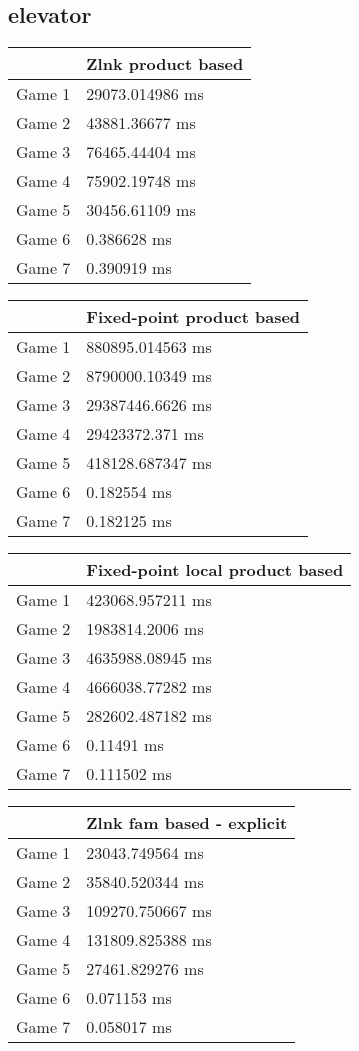 \subsection{elevator}
\begin{tabular}{|l|l|}
	\hline
	& Zlnk product based \\ \hline
	Game 1 & 29073.014986 ms \\ \hline
	Game 2 & 43881.36677 ms \\ \hline
	Game 3 & 76465.44404 ms \\ \hline
	Game 4 & 75902.19748 ms \\ \hline
	Game 5 & 30456.61109 ms \\ \hline
	Game 6 & 0.386628 ms \\ \hline
	Game 7 & 0.390919 ms \\ \hline
\end{tabular}
\begin{tabular}{|l|l|}
	\hline
	& Fixed-point product based \\ \hline
	Game 1 & 880895.014563 ms \\ \hline
	Game 2 & 8790000.10349 ms \\ \hline
	Game 3 & 29387446.6626 ms \\ \hline
	Game 4 & 29423372.371 ms \\ \hline
	Game 5 & 418128.687347 ms \\ \hline
	Game 6 & 0.182554 ms \\ \hline
	Game 7 & 0.182125 ms \\ \hline
\end{tabular}
\begin{tabular}{|l|l|}
	\hline
	& Fixed-point local product based \\ \hline
	Game 1 & 423068.957211 ms \\ \hline
	Game 2 & 1983814.2006 ms \\ \hline
	Game 3 & 4635988.08945 ms \\ \hline
	Game 4 & 4666038.77282 ms \\ \hline
	Game 5 & 282602.487182 ms \\ \hline
	Game 6 & 0.11491 ms \\ \hline
	Game 7 & 0.111502 ms \\ \hline
\end{tabular}
\begin{tabular}{|l|l|}
	\hline
	& Zlnk fam based - explicit \\ \hline
	Game 1 & 23043.749564 ms \\ \hline
	Game 2 & 35840.520344 ms \\ \hline
	Game 3 & 109270.750667 ms \\ \hline
	Game 4 & 131809.825388 ms \\ \hline
	Game 5 & 27461.829276 ms \\ \hline
	Game 6 & 0.071153 ms \\ \hline
	Game 7 & 0.058017 ms \\ \hline
\end{tabular}
